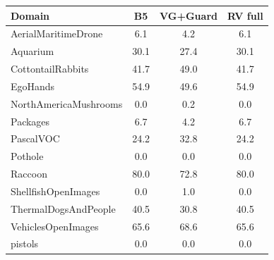 \begin{tabular}{lccc}
\toprule
Domain & B5 & VG+Guard & RV full \\
\midrule
AerialMaritimeDrone & 6.1 & 4.2 & 6.1 \\
Aquarium & 30.1 & 27.4 & 30.1 \\
CottontailRabbits & 41.7 & 49.0 & 41.7 \\
EgoHands & 54.9 & 49.6 & 54.9 \\
NorthAmericaMushrooms & 0.0 & 0.2 & 0.0 \\
Packages & 6.7 & 4.2 & 6.7 \\
PascalVOC & 24.2 & 32.8 & 24.2 \\
Pothole & 0.0 & 0.0 & 0.0 \\
Raccoon & 80.0 & 72.8 & 80.0 \\
ShellfishOpenImages & 0.0 & 1.0 & 0.0 \\
ThermalDogsAndPeople & 40.5 & 30.8 & 40.5 \\
VehiclesOpenImages & 65.6 & 68.6 & 65.6 \\
pistols & 0.0 & 0.0 & 0.0 \\
\bottomrule
\end{tabular}
